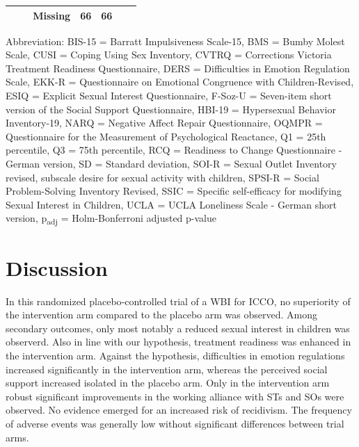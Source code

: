\documentclass[
  super,
  preprint,
  1p,
  onecolumn]{elsarticle}
\begin{document}
\begin{table}
{\begin{tabular*}{\linewidth}{@{\extracolsep{\fill}}lcccc}
    Missing & 66 & 66 &  &  \\ 
\bottomrule
\end{tabular*}
\begin{minipage}{\linewidth}
\vspace{.05em}
\parbox{\linewidth}{\raggedright {Abbreviation: BIS-15 = Barratt Impulsiveness Scale-15, BMS = Bumby Molest Scale, CUSI = Coping Using Sex Inventory, CVTRQ = Corrections Victoria Treatment Readiness Questionnaire, DERS = Difficulties in Emotion Regulation Scale, EKK-R = Questionnaire on Emotional Congruence with Children-Revised, ESIQ = Explicit Sexual Interest Questionnaire, F-Soz-U = Seven-item short version of the Social Support Questionnaire, HBI-19 = Hypersexual Behavior Inventory-19, NARQ = Negative Affect Repair Questionnaire, OQMPR = Questionnaire for the Measurement of Psychological Reactance, Q1 = 25th percentile, Q3 = 75th percentile, RCQ = Readiness to Change Questionnaire - German version, SD = Standard deviation, SOI-R = Sexual Outlet Inventory revised, subscale desire for sexual activity with children, SPSI-R = Social Problem-Solving Inventory Revised, SSIC = Specific self-efficacy for modifying Sexual Interest in Children, UCLA = UCLA Loneliness Scale - German short version, p\textsubscript{adj} = Holm-Bonferroni adjusted p-value\\
}}\end{minipage}

}

\end{table}%

\newpage{}

\section{Discussion}\label{discussion}

In this randomized placebo‑controlled trial of a WBI for ICCO, no
superiority of the intervention arm compared to the placebo arm was
observed. Among secondary outcomes, only most notably a reduced sexual
interest in children was observerd. Also in line with our hypothesis,
treatment readiness was enhanced in the intervention arm. Against the
hypothesis, difficulties in emotion regulations increased significantly
in the intervention arm, whereas the perceived social support increased
isolated in the placebo arm. Only in the intervention arm robust
significant improvements in the working alliance with STs and SOs were
observed. No evidence emerged for an increased risk of recidivism. The
frequency of adverse events was generally low without significant
differences between trial arms.
\end{document}
